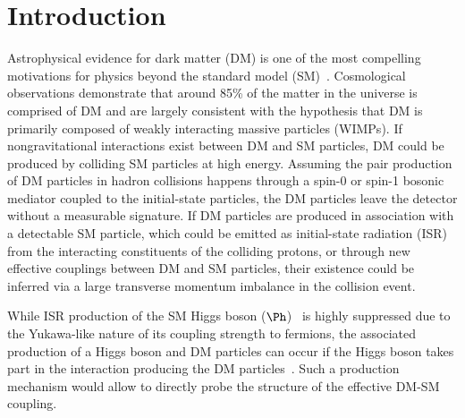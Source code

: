 \section{Introduction} \label{intro}

Astrophysical evidence for dark matter (DM) is one of the most compelling motivations for
physics beyond the standard model
(SM)~\cite{dm1,dm2,dm3}. Cosmological observations demonstrate that
around 85\% of the matter in the universe is comprised of DM
\cite{planck} and are largely consistent with the hypothesis that DM is primarily composed of
weakly interacting massive particles (WIMPs). If nongravitational
interactions exist between DM and SM particles, DM could be produced
by colliding SM particles at high energy. Assuming the pair
production of DM particles in hadron collisions happens through a
spin-0 or spin-1 bosonic mediator coupled to the initial-state particles, the DM particles leave the
detector without a measurable signature. If DM particles are produced in association with a detectable SM particle, which could be emitted
as initial-state radiation (ISR) from the interacting constituents of the colliding protons, or through
new effective couplings between DM and SM particles, their
existence could be inferred via a large transverse momentum imbalance in the collision event. 


While ISR production of the SM Higgs boson ($\Ph$)~\cite{HiggsObs_ATLAS, HiggsObs_CMS, HiggsObs_CMS_Long} is highly suppressed due to the Yukawa-like nature of its coupling strength to fermions, the associated production of a Higgs boson and DM particles
can occur if the
Higgs boson takes part in the interaction producing the DM particles~\cite{monoHiggs3,2HDM,PhysRevD.89.075017}.
Such a production mechanism would allow to directly probe the structure of the effective DM-SM coupling.


